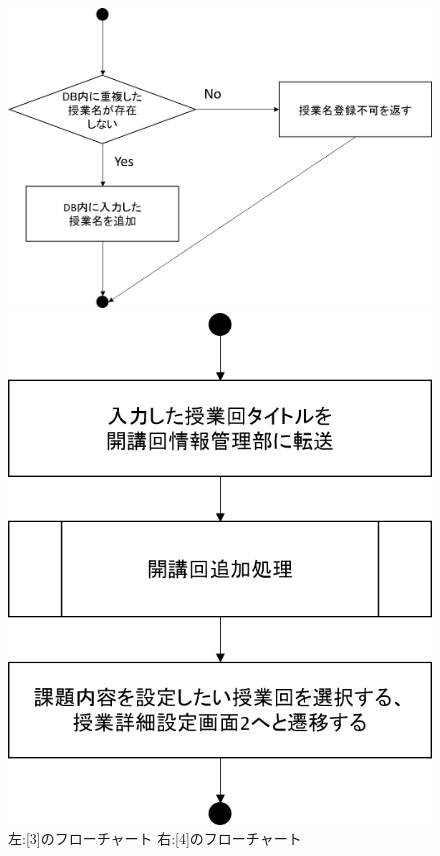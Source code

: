 \begin{figure}[htbp]
 \begin{minipage}{0.5\hsize}
  \begin{center}
   \includegraphics[width=1\linewidth,clip]{./img/create_lecture/sub3.png}
  \end{center}
 \end{minipage}
 \begin{minipage}{0.5\hsize}
  \begin{center}
   \includegraphics[width=1\linewidth,clip]{./img/create_lecture/sub4.png}
  \end{center}
 \end{minipage}
 \caption{左:[3]のフローチャート 右:[4]のフローチャート}\label{fig:createlectureflow1}
\end{figure}


